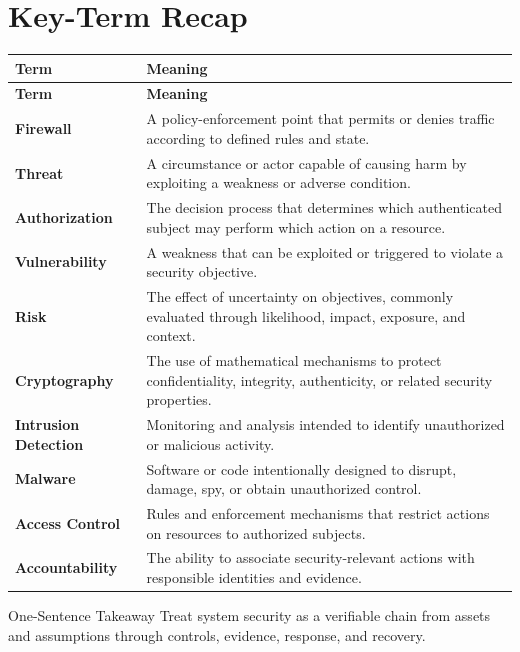 \documentclass[11pt,letterpaper]{article}
\begin{document}
\section*{Key-Term Recap}
\begin{longtable}{>{\raggedright\arraybackslash}p{}>{\raggedright\arraybackslash}p{}}
\toprule\rowcolor{Navy}\color{white}\textbf{Term} & \color{white}\textbf{Meaning}\\\midrule
\endfirsthead
\toprule\rowcolor{Navy}\color{white}\textbf{Term} & \color{white}\textbf{Meaning}\\\midrule
\endhead
\textbf{Firewall} & A policy-enforcement point that permits or denies traffic according to defined rules and state. \\\midrule
\textbf{Threat} & A circumstance or actor capable of causing harm by exploiting a weakness or adverse condition. \\\midrule
\textbf{Authorization} & The decision process that determines which authenticated subject may perform which action on a resource. \\\midrule
\textbf{Vulnerability} & A weakness that can be exploited or triggered to violate a security objective. \\\midrule
\textbf{Risk} & The effect of uncertainty on objectives, commonly evaluated through likelihood, impact, exposure, and context. \\\midrule
\textbf{Cryptography} & The use of mathematical mechanisms to protect confidentiality, integrity, authenticity, or related security properties. \\\midrule
\textbf{Intrusion Detection} & Monitoring and analysis intended to identify unauthorized or malicious activity. \\\midrule
\textbf{Malware} & Software or code intentionally designed to disrupt, damage, spy, or obtain unauthorized control. \\\midrule
\textbf{Access Control} & Rules and enforcement mechanisms that restrict actions on resources to authorized subjects. \\\midrule
\textbf{Accountability} & The ability to associate security-relevant actions with responsible identities and evidence. \\\midrule
\bottomrule
\end{longtable}
\begin{CornellExamBox}{One-Sentence Takeaway}
Treat system security as a verifiable chain from assets and assumptions through controls, evidence, response, and recovery.
\end{CornellExamBox}
\end{document}
